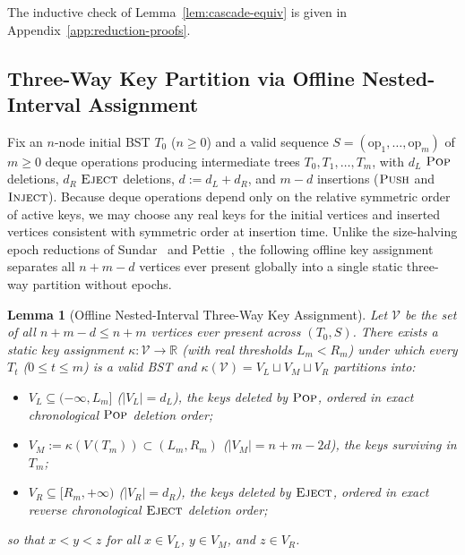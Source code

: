 \documentclass[11pt]{article}
\newtheorem{lemma}[theorem]{Lemma}
\theoremstyle{definition}
\theoremstyle{remark}
\newcommand{\PUSH}{\textnormal{\scshape Push}}
\newcommand{\POP}{\textnormal{\scshape Pop}}
\newcommand{\INJECT}{\textnormal{\scshape Inject}}
\newcommand{\EJECT}{\textnormal{\scshape Eject}}
\begin{document}
The inductive check of Lemma~\ref{lem:cascade-equiv} is given in Appendix~\ref{app:reduction-proofs}.


\subsection{Three-Way Key Partition via Offline Nested-Interval Assignment}
\label{subsec:three-way-partition}

Fix an $n$-node initial BST $T_0$ ($n \ge 0$) and a valid sequence $S = (\mathrm{op}_1, \dots, \mathrm{op}_m)$ of $m \ge 0$ deque operations producing intermediate trees $T_0, T_1, \dots, T_m$, with $d_L$ $\POP$ deletions, $d_R$ $\EJECT$ deletions, $d := d_L + d_R$, and $m - d$ insertions ($\PUSH$ and $\INJECT$). Because deque operations depend only on the relative symmetric order of active keys, we may choose any real keys for the initial vertices and inserted vertices consistent with symmetric order at insertion time. Unlike the size-halving epoch reductions of Sundar~\cite[Section~3, Theorem~7]{Sundar1992} and Pettie~\cite[Section~2]{Pettie2008}, the following offline key assignment separates all $n + m - d$ vertices ever present globally into a single static three-way partition without epochs.

\begin{lemma}[Offline Nested-Interval Three-Way Key Assignment]
\label{lem:nested-keys}
Let $\mathcal{V}$ be the set of all $n + m - d \le n + m$ vertices ever present across $(T_0, S)$. There exists a static key assignment $\kappa : \mathcal{V} \to \mathbb{R}$ (with real thresholds $L_m < R_m$) under which every $T_t$ ($0 \le t \le m$) is a valid BST and $\kappa(\mathcal{V}) = V_L \sqcup V_M \sqcup V_R$ partitions into:
\begin{itemize}[leftmargin=2em]
  \item $V_L \subseteq (-\infty, L_m]$ ($|V_L| = d_L$), the keys deleted by $\POP$, ordered in exact chronological $\POP$ deletion order;
  \item $V_M := \kappa(V(T_m)) \subset (L_m, R_m)$ ($|V_M| = n + m - 2d$), the keys surviving in $T_m$;
  \item $V_R \subseteq [R_m, +\infty)$ ($|V_R| = d_R$), the keys deleted by $\EJECT$, ordered in exact reverse chronological $\EJECT$ deletion order;
\end{itemize}
so that $x < y < z$ for all $x \in V_L$, $y \in V_M$, and $z \in V_R$.
\end{lemma}
\end{document}
